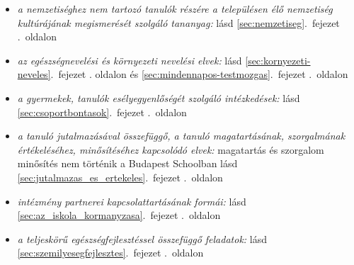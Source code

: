 \begin{itemize}
\item \emph{a nemzetiséghez nem tartozó tanulók részére a településen élő nemzetiség kultúrájának megismerését szolgáló tananyag: }    
       lásd        \ref{sec:nemzetiseg}.~fejezet .~oldalon
              
\item \emph{az egészségnevelési és környezeti nevelési elvek: }    
       lásd        \ref{sec:kornyezeti-neveles}.~fejezet
       . oldalon és 
              \ref{sec:mindennapos-testmozgas}.~fejezet .~oldalon
              
\item \emph{a gyermekek, tanulók esélyegyenlőségét szolgáló intézkedések: }    
       lásd        \ref{sec:csoportbontasok}.~fejezet .~oldalon
              
\item \emph{a tanuló jutalmazásával összefüggő, a tanuló magatartásának, szorgalmának értékeléséhez, minősítéséhez kapcsolódó elvek: }   magatartás és szorgalom minősítés nem történik a Budapest Schoolban 
       lásd        \ref{sec:jutalmazas_es_ertekeles}.~fejezet .~oldalon
              
\item \emph{intézmény partnerei kapcsolattartásának formái: }    
       lásd        \ref{sec:az_iskola_kormanyzasa}.~fejezet .~oldalon
              
\item \emph{a teljeskörű egészségfejlesztéssel összefüggő feladatok: }    
       lásd        \ref{sec:szemilyesegfejlesztes}.~fejezet .~oldalon
              
\end{itemize}

